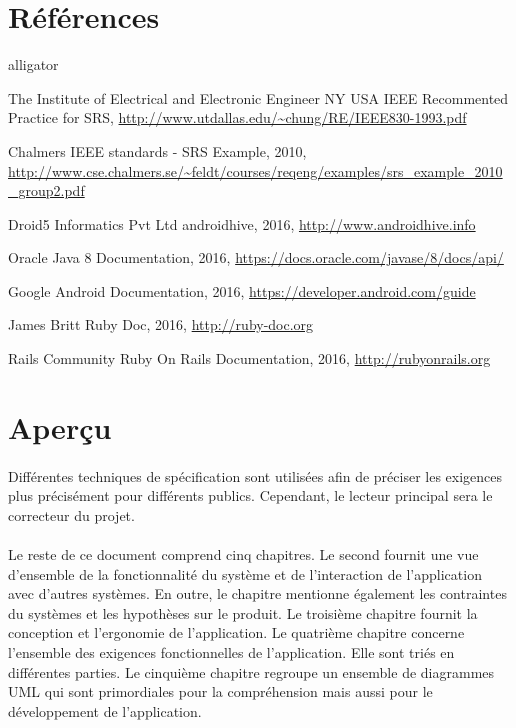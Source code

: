 \documentclass[titlepage, 12pt]{report}
\begin{document}
\section{Références}
\begin{labeling}{alligator}
	\item [The Institute of Electrical and Electronic Engineer NY USA] IEEE Recommented Practice for SRS, \url{http://www.utdallas.edu/~chung/RE/IEEE830-1993.pdf}
	\item [Chalmers] IEEE standards - SRS Example, 2010, \url{http://www.cse.chalmers.se/~feldt/courses/reqeng/examples/srs_example_2010_group2.pdf}
	\item [Droid5 Informatics Pvt Ltd] androidhive, 2016, \url{http://www.androidhive.info}
	\item [Oracle] Java 8 Documentation, 2016, \url{https://docs.oracle.com/javase/8/docs/api/}
	\item [Google] Android Documentation, 2016, \url{https://developer.android.com/guide}
	\item [James Britt] Ruby Doc, 2016, \url{http://ruby-doc.org}
	\item [Rails Community] Ruby On Rails Documentation, 2016, \url{http://rubyonrails.org}
\end{labeling}

\section{Aperçu}

\paragraph{}Différentes techniques de spécification sont utilisées afin de préciser les exigences plus précisément pour différents publics. Cependant, le lecteur principal sera le correcteur du projet.

\paragraph{}Le reste de ce document comprend cinq chapitres. Le second fournit une vue d'ensemble de la fonctionnalité du système et de l'interaction de l'application avec d'autres systèmes. En outre, le chapitre mentionne également les contraintes du systèmes et les hypothèses sur le produit.
Le troisième chapitre fournit la conception et l'ergonomie de l'application.
Le quatrième chapitre concerne l'ensemble des exigences fonctionnelles de l'application. Elle sont triés en différentes parties.
Le cinquième chapitre regroupe un ensemble de diagrammes UML qui sont primordiales pour la compréhension mais aussi pour le développement de l'application.
\end{document}
